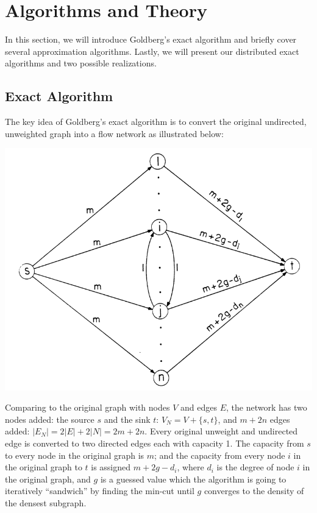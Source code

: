 \documentclass{article}
\begin{document}
\section{Algorithms and Theory}
In this section, we will introduce Goldberg's exact algorithm and briefly cover several approximation algorithms. Lastly, we will present our distributed exact algorithms and two possible realizations.

\subsection{Exact Algorithm}
The key idea of Goldberg's exact algorithm is to convert the original undirected, unweighted graph into a flow network as illustrated below:

\includegraphics[width=\columnwidth]{goldberg_network.png}

Comparing to the original graph with nodes $V$ and edges $E$, the network has two nodes added: the source $s$ and the sink $t$: $V_N = V + \{s, t\}$, and $m + 2n$ edges added: $|E_N| = 2|E| + 2|N| = 2m + 2n$. Every original unweight and undirected edge is converted to two directed edges each with capacity 1. The capacity from $s$ to every node in the original graph is $m$; and the capacity from every node $i$ in the original graph to $t$ is assigned $m + 2g - d_i$, where $d_i$ is the degree of node $i$ in the original graph, and $g$ is a guessed value which the algorithm is going to iteratively ``sandwich'' by finding the min-cut until $g$ converges to the density of the densest subgraph.
\end{document}
